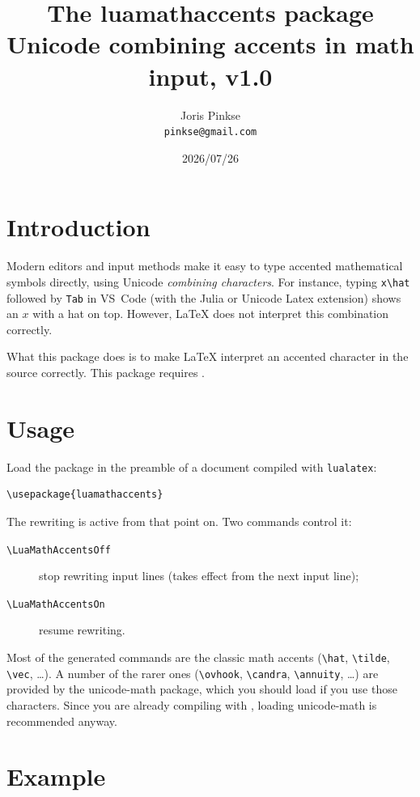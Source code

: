 \documentclass{article}
\title{The \textsf{luamathaccents} package\\[1ex]
  \large Unicode combining accents in math input, v1.0}
\author{Joris Pinkse\\\texttt{pinkse@gmail.com}}
\date{2026/07/26}
\begin{document}
\maketitle

\section{Introduction}

Modern editors and input methods make it easy to type accented
mathematical symbols directly, using Unicode \emph{combining
characters}.  For instance, typing \texttt{x\textbackslash hat}
followed by \texttt{Tab} in VS~Code (with the Julia or Unicode Latex
extension) shows an $x$ with a hat on top.  However, \LaTeX{} does not
interpret this combination correctly.

What this package does is to make \LaTeX{} interpret an accented
character in the source correctly.  This package requires \LuaLaTeX{}.

\section{Usage}

Load the package in the preamble of a document compiled with
\texttt{lualatex}:

\begin{verbatim}
\usepackage{luamathaccents}
\end{verbatim}

The rewriting is active from that point on.  Two commands control it:

\begin{description}
  \item[\texttt{\textbackslash LuaMathAccentsOff}] stop rewriting input
    lines (takes effect from the next input line);
  \item[\texttt{\textbackslash LuaMathAccentsOn}] resume rewriting.
\end{description}

Most of the generated commands are the classic math accents
(\verb|\hat|, \verb|\tilde|, \verb|\vec|, \ldots).  A number of the
rarer ones (\verb|\ovhook|, \verb|\candra|, \verb|\annuity|, \ldots)
are provided by the \textsf{unicode-math} package, which you should
load if you use those characters.  Since you are already compiling
with \LuaTeX{}, loading \textsf{unicode-math} is recommended anyway.

\section{Example}
\end{document}
